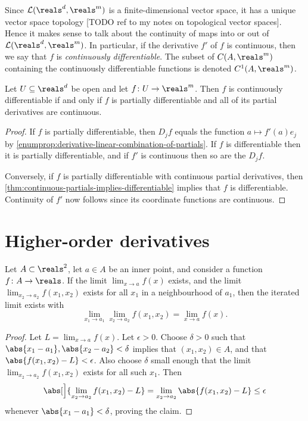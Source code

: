 \documentclass[article, a4paper, 11pt, oneside]{memoir}
\numberwithin{equation}{chapter}
\newcommand{\calL}{\mathcal{L}}
\begin{document}
Since $\calL(\reals^d,\reals^m)$ is a finite-dimensional vector space, it has a unique vector space topology [TODO ref to my notes on topological vector spaces]. Hence it makes sense to talk about the continuity of maps into or out of $\calL(\reals^d,\reals^m)$. In particular, if the derivative $f'$ of $f$ is continuous, then we say that $f$ is \emph{continuously differentiable}. The subset of $C(A,\reals^m)$ containing the continuously differentiable functions is denoted $C^1(A,\reals^m)$.

\begin{corollary}
    Let $U \subseteq \reals^d$ be open and let $f \colon U \to \reals^m$. Then $f$ is continuously differentiable if and only if $f$ is partially differentiable and all of its partial derivatives are continuous.
\end{corollary}

\begin{proof}
    If $f$ is partially differentiable, then $D_j f$ equals the function $a \mapsto f'(a) e_j$ by \cref{enumprop:derivative-linear-combination-of-partials}. If $f$ is differentiable then it is partially differentiable, and if $f'$ is continuous then so are the $D_j f$.

    Conversely, if $f$ is partially differentiable with continuous partial derivatives, then \cref{thm:continuous-partials-implies-differentiable} implies that $f$ is differentiable. Continuity of $f'$ now follows since its coordinate functions are continuous.
\end{proof}


\section{Higher-order derivatives}

\begin{lemma}
    \label{lem:iterated-limit}
    Let $A \subset \reals^2$, let $a \in A$ be an inner point, and consider a function $f \colon A \to \reals$. If the limit $\lim_{x \to a} f(x)$ exists, and the limit $\lim_{x_2 \to a_2} f(x_1,x_2)$ exists for all $x_1$ in a neighbourhood of $a_1$, then the iterated limit exists with
    \begin{equation*}
        \lim_{x_1 \to a_1} \lim_{x_2 \to a_2} f(x_1,x_2)
            = \lim_{x \to a} f(x).
    \end{equation*}
\end{lemma}

\begin{proof}
    Let $L = \lim_{x \to a} f(x)$. Let $\epsilon > 0$. Choose $\delta > 0$ such that $\abs{x_1 - a_1}, \abs{x_2 - a_2} < \delta$ implies that $(x_1,x_2) \in A$, and that $\abs{f(x_1,x_2) - L} < \epsilon$. Also choose $\delta$ small enough that the limit $\lim_{x_2 \to a_2} f(x_1,x_2)$ exists for all such $x_1$. Then
    \begin{equation*}
        \abs[\Big]{\lim_{x_2 \to a_2} f(x_1,x_2) - L}
            = \lim_{x_2 \to a_2} \abs{f(x_1,x_2) - L}
            \leq \epsilon
    \end{equation*}
    whenever $\abs{x_1 - a_1} < \delta$, proving the claim.
\end{proof}
\end{document}
